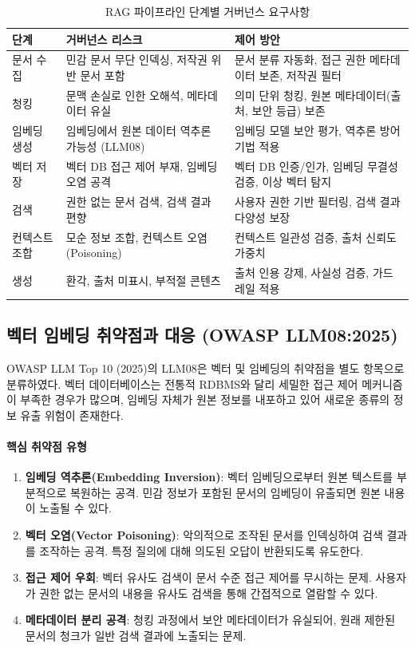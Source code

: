 \begin{table}[htbp]
\centering
\caption{RAG 파이프라인 단계별 거버넌스 요구사항}
\label{tab:rag_governance_stages}
\begin{tabularx}{\textwidth}{p{2cm}p{3.5cm}X}
\toprule
\textbf{단계} & \textbf{거버넌스 리스크} & \textbf{제어 방안} \\
\midrule
문서 수집 & 민감 문서 무단 인덱싱, 저작권 위반 문서 포함 & 문서 분류 자동화, 접근 권한 메타데이터 보존, 저작권 필터 \\
\midrule
청킹 & 문맥 손실로 인한 오해석, 메타데이터 유실 & 의미 단위 청킹, 원본 메타데이터(출처, 보안 등급) 보존 \\
\midrule
임베딩 생성 & 임베딩에서 원본 데이터 역추론 가능성 (LLM08) & 임베딩 모델 보안 평가, 역추론 방어 기법 적용 \\
\midrule
벡터 저장 & 벡터 DB 접근 제어 부재, 임베딩 오염 공격 & 벡터 DB 인증/인가, 임베딩 무결성 검증, 이상 벡터 탐지 \\
\midrule
검색 & 권한 없는 문서 검색, 검색 결과 편향 & 사용자 권한 기반 필터링, 검색 결과 다양성 보장 \\
\midrule
컨텍스트 조합 & 모순 정보 조합, 컨텍스트 오염(Poisoning) & 컨텍스트 일관성 검증, 출처 신뢰도 가중치 \\
\midrule
생성 & 환각, 출처 미표시, 부적절 콘텐츠 & 출처 인용 강제, 사실성 검증, 가드레일 적용 \\
\bottomrule
\end{tabularx}
\end{table}


\subsection{벡터 임베딩 취약점과 대응 (OWASP LLM08:2025)}
\label{sec:13.4.2}

OWASP LLM Top 10 (2025)의 LLM08은 벡터 및 임베딩의 취약점을 별도 항목으로 분류하였다. 벡터 데이터베이스는 전통적 RDBMS와 달리 세밀한 접근 제어 메커니즘이 부족한 경우가 많으며, 임베딩 자체가 원본 정보를 내포하고 있어 새로운 종류의 정보 유출 위험이 존재한다.

\paragraph{핵심 취약점 유형}

\begin{enumerate}
 \item \textbf{임베딩 역추론(Embedding Inversion)}: 벡터 임베딩으로부터 원본 텍스트를 부분적으로 복원하는 공격. 민감 정보가 포함된 문서의 임베딩이 유출되면 원본 내용이 노출될 수 있다.
 \item \textbf{벡터 오염(Vector Poisoning)}: 악의적으로 조작된 문서를 인덱싱하여 검색 결과를 조작하는 공격. 특정 질의에 대해 의도된 오답이 반환되도록 유도한다.
 \item \textbf{접근 제어 우회}: 벡터 유사도 검색이 문서 수준 접근 제어를 무시하는 문제. 사용자가 권한 없는 문서의 내용을 유사도 검색을 통해 간접적으로 열람할 수 있다.
 \item \textbf{메타데이터 분리 공격}: 청킹 과정에서 보안 메타데이터가 유실되어, 원래 제한된 문서의 청크가 일반 검색 결과에 노출되는 문제.
\end{enumerate}

